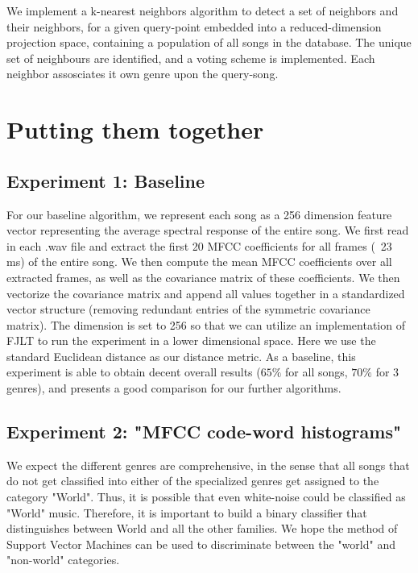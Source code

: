 \documentclass[10pt]{article}
\begin{document}
We implement a k-nearest neighbors algorithm to detect a set of neighbors and their neighbors, for a given query-point embedded into a reduced-dimension projection space, containing a population of all songs in the database. The unique set of neighbours are identified, and a voting scheme is implemented. Each neighbor assosciates it own genre upon the query-song. 

\section{Putting them together}

\subsection{Experiment 1: Baseline}
For our baseline algorithm, we represent each song as a 256 dimension feature vector representing the average spectral response of the entire song.  We first read in each .wav file and extract the first 20 MFCC coefficients for all frames (~23 ms) of the entire song.  We then compute the mean MFCC coefficients over all extracted frames, as well as the covariance matrix of these coefficients.  We then vectorize the covariance matrix and append all values together in a standardized vector structure (removing redundant entries of the symmetric covariance matrix).  The dimension is set to 256 so that we can utilize an implementation of FJLT to run the experiment in a lower dimensional space.  Here we use the standard Euclidean distance as our distance metric.  As a baseline, this experiment is able to obtain decent overall results ($65\%$ for all songs, $70\%$ for 3 genres), and presents a good comparison for our further algorithms.  



\subsection{Experiment 2: "MFCC code-word histograms"}
We expect the different genres are comprehensive, in the sense that all songs that do not get classified into either of the specialized genres get assigned to the category "World". Thus, it is possible that even white-noise could be classified as "World" music. Therefore, it is important to build a binary classifier that distinguishes between World and all the other families. We hope the method of Support Vector Machines can be used to discriminate between the "world" and "non-world" categories. 
\end{document}
